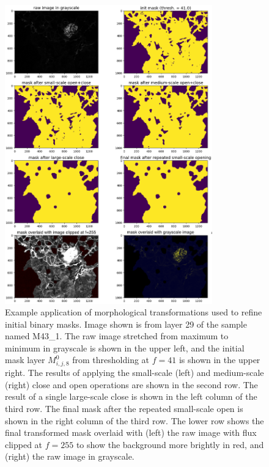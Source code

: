 \documentclass[letterpaper,11pt]{article}
\begin{document}
\begin{figure}[!ht]
\centering
\includegraphics[width=0.80\textwidth]{images/masking/image_6455_layer_29_masks}
\caption{\footnotesize Example application of morphological transformations used to refine initial binary masks. Image shown is from layer 29 of the sample named M43\_1. The raw image stretched from maximum to minimum in grayscale is shown in the upper left, and the initial mask layer $M^{0}_{i,j,8}$ from thresholding at $f=41$ is shown in the upper right. The results of applying the small-scale (left) and medium-scale (right) close and open operations are shown in the second row. The result of a single large-scale close is shown in the left column of the third row. The final mask after the repeated small-scale open is shown in the right column of the third row. The lower row shows the final transformed mask overlaid with (left) the raw image with flux clipped at $f=255$ to show the background more brightly in red, and (right) the raw image in grayscale.}
\label{fig:mask_example_med}
\end{figure}
\end{document}
